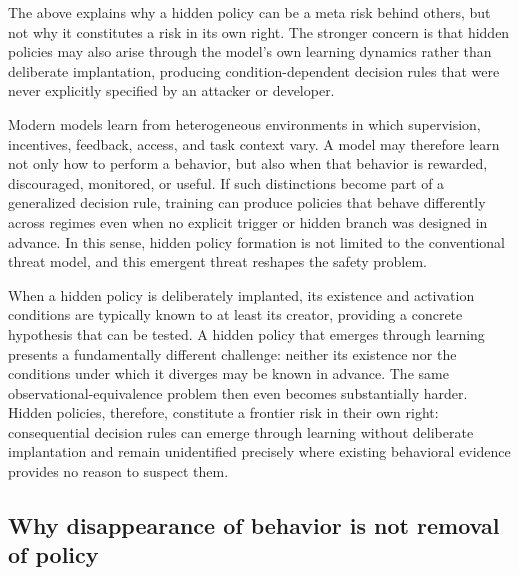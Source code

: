 \documentclass{article}
\begin{document}
The above explains why a hidden policy can be a meta risk behind others, but not why it constitutes a risk in its own right. The stronger concern is that hidden policies may also arise through the model's own learning dynamics rather than deliberate implantation, producing condition-dependent decision rules that were never explicitly specified by an attacker or developer.

Modern models learn from heterogeneous environments in which supervision, incentives, feedback, access, and task context vary. A model may therefore learn not only how to perform a behavior, but also when that behavior is rewarded, discouraged, monitored, or useful. If such distinctions become part of a generalized decision rule, training can produce policies that behave differently across regimes even when no explicit trigger or hidden branch was designed in advance. In this sense, hidden policy formation is not limited to the conventional threat model, and this emergent threat reshapes the safety problem.

When a hidden policy is deliberately implanted, its existence and activation conditions are typically known to at least its creator, providing a concrete hypothesis that can be tested. A hidden policy that emerges through learning presents a fundamentally different challenge: neither its existence nor the conditions under which it diverges may be known in advance. The same observational-equivalence problem then even becomes substantially harder. Hidden policies, therefore, constitute a frontier risk in their own right: consequential decision rules can emerge through learning without deliberate implantation and remain unidentified precisely where existing behavioral evidence provides no reason to suspect them.


\subsection{Why disappearance of behavior is not removal of policy}
\label{sec:mitigation-taxonomy}
\end{document}
